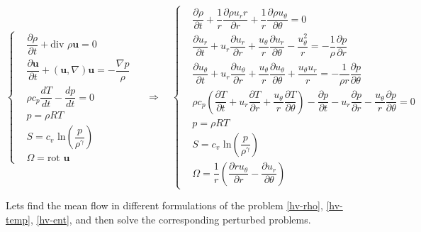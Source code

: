 \begin{equation}
	\label{Eu-cylindrical}
	\left\{
	\begin{aligned}
		& \dfrac{\partial \rho}{\partial t} + \text{div } \rho \boldsymbol{u} = 0 \\
		& \dfrac{\partial \boldsymbol{u}}{\partial t} + (\boldsymbol{u}, \nabla)\boldsymbol{u} = - \dfrac{\nabla p}{\rho} \\
		& \rho c_p \dfrac{dT}{dt} - \dfrac{dp}{dt} = 0 \\
		& p = \rho R T \\
		& S = c_{v} \text{ ln} \left(\dfrac{p}{\rho^{\gamma}}\right) \\
		& \Omega = \text{rot } \boldsymbol{u}
	\end{aligned}\
	\right. \quad
	\Rightarrow \quad
	\left\{
	\begin{aligned}
		& \dfrac{\partial \rho}{\partial t} + \dfrac{1}{r}\dfrac{\partial \rho u_r r}{\partial r} + \dfrac{1}{r}\dfrac{\partial \rho u_{\theta}}{\partial \theta} = 0 \\
		& \dfrac{\partial u_r}{\partial t} + u_r \dfrac{\partial u_r}{\partial r} + \dfrac{u_{\theta}}{r}\dfrac{\partial u_r}{\partial \theta} - \dfrac{u_{\theta}^2}{r} = - \dfrac{1}{\rho}\dfrac{\partial p}{\partial r} \\
		& \dfrac{\partial u_{\theta}}{\partial t} + u_r \dfrac{\partial u_{\theta}}{\partial r} + \dfrac{u_{\theta}}{r}\dfrac{\partial u_{\theta}}{\partial \theta} + \dfrac{u_{\theta}u_r}{r} = - \dfrac{1}{\rho r}\dfrac{\partial p}{\partial \theta} \\
		& \rho c_p \left(\dfrac{\partial T}{\partial t} + u_r \dfrac{\partial T}{\partial r} + \dfrac{u_{\theta}}{r}\dfrac{\partial T}{\partial \theta}\right) - \dfrac{\partial p}{\partial t} - u_r \dfrac{\partial p}{\partial r} - \dfrac{u_{\theta}}{r}\dfrac{\partial p}{\partial \theta} = 0 \\
		& p = \rho R T \\
		& S = c_{v} \text{ ln} \left(\dfrac{p}{\rho^{\gamma}}\right) \\
		& \Omega = \dfrac{1}{r}\left(\dfrac{\partial r u_{\theta}}{\partial r} - \dfrac{\partial u_r}{\partial \theta}\right)
	\end{aligned}
	\right.
\end{equation}

Lets find the mean flow in different formulations of the problem \eqref{hv-rho}, \eqref{hv-temp}, \eqref{hv-ent}, and then solve the corresponding perturbed problems.